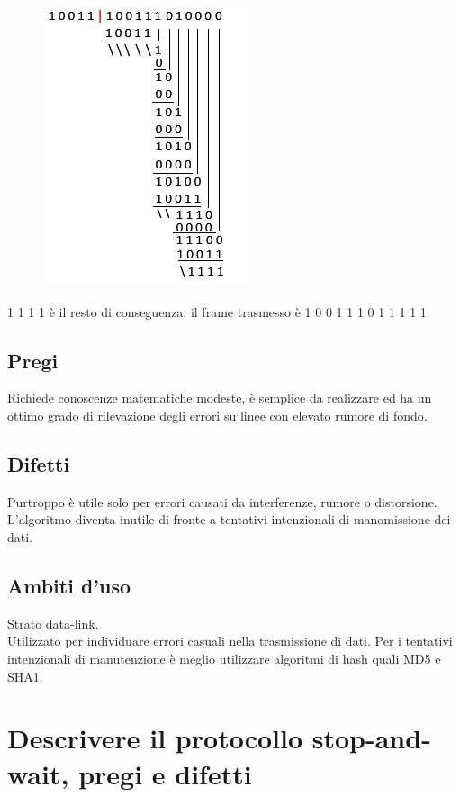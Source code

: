 \begin{figure}[H]
\centering
\includegraphics[scale=0.65]{res/img/16_DivisioneEsCRC.png}
\end{figure}
             
1 1 1 1 è il resto di conseguenza, il frame trasmesso è 1 0 0 1  1 1 0 1  1 1 1 1.

\subsection{Pregi}
Richiede conoscenze matematiche modeste, è semplice da realizzare ed ha un ottimo grado di rilevazione degli errori su linee con elevato rumore di fondo.

\subsection{Difetti}
Purtroppo è utile solo per errori causati da interferenze, rumore o distorsione.
L'algoritmo diventa inutile di fronte a tentativi intenzionali di manomissione dei dati.

\subsection{Ambiti d'uso}
Strato data-link.\\
Utilizzato per individuare errori casuali nella trasmissione di dati.
Per i tentativi intenzionali di manutenzione è meglio utilizzare algoritmi di hash quali MD5 e SHA1.

\section{Descrivere il protocollo stop-and-wait, pregi e difetti}

